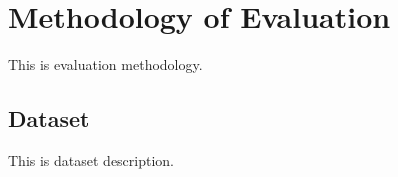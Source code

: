 \section{Methodology of Evaluation}
%
This is evaluation methodology.
%
\subsection{Dataset}
%
This is dataset description.
